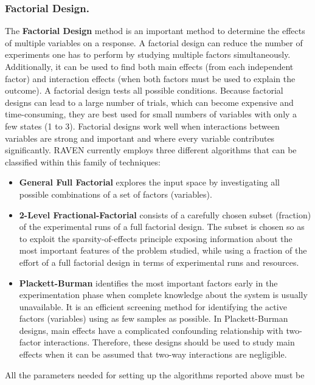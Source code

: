 \subsubsection{Factorial Design.}
\label{subsubsubsec:FactorialDOE}
The \textbf{Factorial Design} method is an important method to determine the
effects of multiple variables on a response.
%
A factorial design can reduce the number of experiments one has to perform by
studying multiple factors simultaneously.
%
Additionally, it can be used to find both main effects (from each independent
factor) and interaction effects (when both factors must be used to explain the
outcome).
%
A factorial design tests all possible conditions.
%
Because factorial designs can lead to a large number of trials, which can
become expensive and time-consuming, they are best used for small numbers of
variables with only a few states (1 to 3).
%
Factorial designs work well when interactions between variables are strong and
important and where every variable contributes significantly.
%
RAVEN currently employs three different algorithms that can be classified within
this family of techniques:
\begin{itemize}
  \item \textbf{General Full Factorial} explores the input space by
    investigating all possible combinations of a set of factors (variables).
  \item \textbf{2-Level Fractional-Factorial} consists of a carefully chosen
    subset (fraction) of the experimental runs of a full factorial design.
    The subset is chosen so as to exploit the sparsity-of-effects principle 
    exposing information about the most important features of the problem
    studied, while using a fraction of the effort of a full factorial design in
    terms of experimental runs and resources.
  \item \textbf{Plackett-Burman} identifies the most important factors early in
    the experimentation phase when complete knowledge about the system is
    usually unavailable.
    It is an efficient screening method for identifying the active factors
    (variables) using as few samples as possible.
    In Plackett-Burman designs, main effects have a complicated confounding
    relationship with two-factor interactions.
    Therefore, these designs should be used to study main effects when it can be
    assumed that two-way interactions are negligible.
\end{itemize}
All the parameters needed for setting up the algorithms reported above must be
